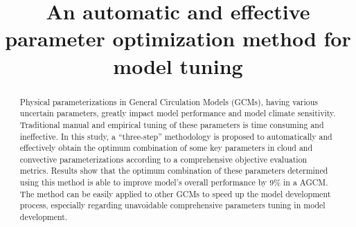 \documentclass[gmd, manuscript]{copernicus}
\begin{document}
\linenumbers

\title{An automatic and effective parameter optimization method for model tuning}
















\maketitle
 

\begin{abstract}  

Physical parameterizations in General Circulation Models (GCMs), having various uncertain parameters, greatly impact model performance and model climate sensitivity.  Traditional manual and empirical tuning of these parameters is time consuming and ineffective. In this study, a ``three-step'' methodology is proposed to automatically and effectively obtain the optimum combination of some key parameters in cloud and convective parameterizations according to a comprehensive objective evaluation metrics. Results show that the optimum combination of these parameters determined using this method is able to improve model’s overall performance by 9\% in a AGCM. The method can be easily applied to other GCMs to speed up the model development process, especially regarding unavoidable comprehensive parameters tuning in model development.

\end{abstract}
\end{document}
